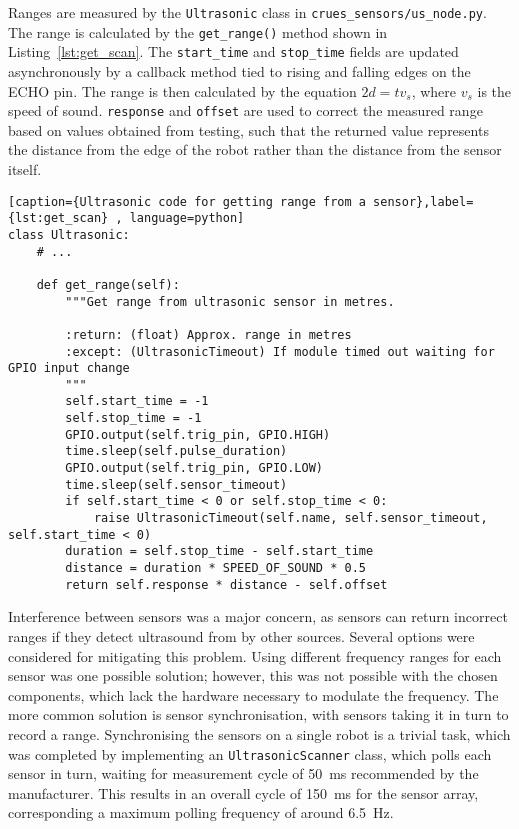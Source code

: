 Ranges are measured by the \verb|Ultrasonic| class in
\verb|crues_sensors/us_node.py|. The range is calculated by the \verb|get_range()|
method shown in Listing~\ref{lst:get_scan}. The \verb|start_time| and
\verb|stop_time| fields are updated asynchronously by a callback method tied to
rising and falling edges on the ECHO pin. The range is then calculated by the
equation $ 2d = tv_s$, where $v_s$ is the speed of sound. \verb|response| and \verb|offset| are
used to correct the measured range based on values obtained from testing, such
that the returned value represents the distance from the edge of the robot rather
than the distance from the sensor itself.

\begin{lstlisting}[caption={Ultrasonic code for getting range from a sensor},label={lst:get_scan} , language=python]
class Ultrasonic:
    # ...

    def get_range(self):
        """Get range from ultrasonic sensor in metres.

        :return: (float) Approx. range in metres
        :except: (UltrasonicTimeout) If module timed out waiting for GPIO input change
        """
        self.start_time = -1
        self.stop_time = -1
        GPIO.output(self.trig_pin, GPIO.HIGH)
        time.sleep(self.pulse_duration)
        GPIO.output(self.trig_pin, GPIO.LOW)
        time.sleep(self.sensor_timeout)
        if self.start_time < 0 or self.stop_time < 0:
            raise UltrasonicTimeout(self.name, self.sensor_timeout, self.start_time < 0)
        duration = self.stop_time - self.start_time
        distance = duration * SPEED_OF_SOUND * 0.5
        return self.response * distance - self.offset
\end{lstlisting}

Interference between sensors was a major concern, as sensors can return incorrect
ranges if they detect ultrasound from by other sources. Several options were
considered for mitigating this problem. Using different frequency ranges for each
sensor was one possible solution; however, this was not possible with the chosen
components, which lack the hardware necessary to modulate the frequency. The
more common solution is sensor synchronisation, with sensors taking it in turn to
record a range. Synchronising the sensors on a single robot is a trivial task,
which was completed by implementing an \verb|UltrasonicScanner| class, which polls
each sensor in turn, waiting for measurement cycle of \SI{50}{\milli\second}
recommended by the manufacturer. This results in an overall cycle of
\SI{150}{\milli\second} for the sensor array, corresponding a maximum polling
frequency of around \SI{6.5}{\hertz}.

